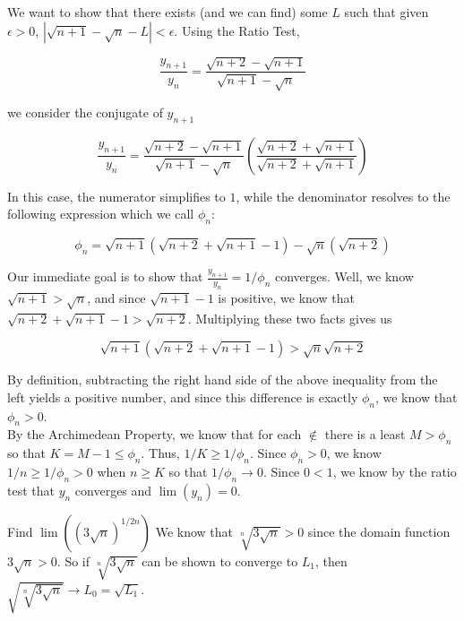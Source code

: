 \documentclass[paper=a4, fontsize=11pt]{scrartcl} %
\numberwithin{equation}{section} %
\numberwithin{figure}{section} %
\numberwithin{table}{section} %
\begin{document}
\pf We want to show that there exists (and we can find) some $L$ such that given $\epsilon > 0$, $|\sqrt{n+1} - \sqrt{n} - L| < \epsilon$. Using the Ratio Test,

\begin{equation*}
\frac{y_{n+1}}{y_n} = \frac{\sqrt{n+2} - \sqrt{n+1}}{\sqrt{n+1} - \sqrt{n}}
\end{equation*}

we consider the conjugate of $y_{n+1}$

\begin{equation*}
\frac{y_{n+1}}{y_n} = \frac{\sqrt{n+2} - \sqrt{n+1}}{\sqrt{n+1} - \sqrt{n}} \left( \frac{\sqrt{n+2} + \sqrt{n+1}}{\sqrt{n+2} + \sqrt{n+1}} \right)
\end{equation*}

In this case, the numerator simplifies to $1$, while the denominator resolves to the following expression which we call $\phi_n$:

\begin{equation*}
\phi_n = \sqrt{n+1}\left(\sqrt{n+2} + \sqrt{n+1} - 1\right) - \sqrt{n}(\sqrt{n+2})
\end{equation*}

Our immediate goal is to show that $\frac{y_{n+1}}{y_n} = 1/\phi_n$ converges. Well, we know $\sqrt{n+1} > \sqrt{n}$, and since $\sqrt{n+1} - 1$ is positive, we know that $\sqrt{n+2} + \sqrt{n+1} - 1 > \sqrt{n+2}$. Multiplying these two facts gives us

\begin{equation*}
\sqrt{n+1}(\sqrt{n+2} + \sqrt{n+1} - 1) > \sqrt{n}\sqrt{n+2}
\end{equation*}

By definition, subtracting the right hand side of the above inequality from the left yields a positive number, and since this difference is exactly $\phi_n$, we know that $\phi_n > 0$.\\

By the Archimedean Property, we know that for each $\nin$ there is a least $M > \phi_n$ so that $K = M - 1 \leq \phi_n$. Thus, $1/K \geq 1/\phi_n$. Since $\phi_n > 0$, we know $1/n \geq 1/\phi_n > 0$ when $n \geq K$ so that $1/\phi_n \rightarrow 0$. Since $0<1$, we know by the ratio test that $y_n$ converges and $\lim(y_n) = 0$.\done

 Find $\lim\left((3\sqrt{n})^{1/2n}\right)$
\pf We know that $\sqrt[n]{3\sqrt{n}} > 0$ since the domain function $3 \sqrt{n} > 0$. So if $\sqrt[n]{3\sqrt{n}}$ can be shown to converge to $L_1$, then $\sqrt{\sqrt[n]{3\sqrt{n}}} \rightarrow L_0 = \sqrt{L_1}$.
\end{document}
